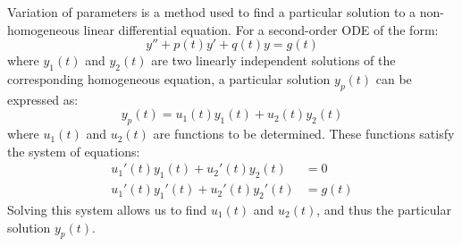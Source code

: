 \documentclass[11pt]{article}
\begin{document}
\begin{definition}
    Variation of parameters is a method used to find a particular solution to a non-homogeneous linear differential equation. For a second-order ODE of the form:
    $$y'' + p(t)y' + q(t)y = g(t)$$
    where \( y_1(t) \) and \( y_2(t) \) are two linearly independent solutions of the corresponding homogeneous equation, a particular solution \( y_p(t) \) can be expressed as:
    \begin{equation}
    y_p(t) = u_1(t)y_1(t) + u_2(t)y_2(t)
    \end{equation}
    where \( u_1(t) \) and \( u_2(t) \) are functions to be determined. These functions satisfy the system of equations:
    \begin{align*}
        u_1'(t)y_1(t) + u_2'(t)y_2(t) &= 0 \\
        u_1'(t)y_1'(t) + u_2'(t)y_2'(t) &= g(t)
    \end{align*}
    Solving this system allows us to find \( u_1(t) \) and \( u_2(t) \), and thus the particular solution \( y_p(t) \).
    
\end{definition}
\end{document}
